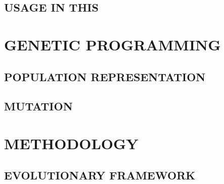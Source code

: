 \documentclass[10pt,twocolumn]{article}
\begin{document}
\subsection{USAGE IN THIS}

\section{GENETIC PROGRAMMING}

\subsection{POPULATION REPRESENTATION}

\subsection{MUTATION}



\section{METHODOLOGY}

\subsection{EVOLUTIONARY FRAMEWORK}
\end{document}
